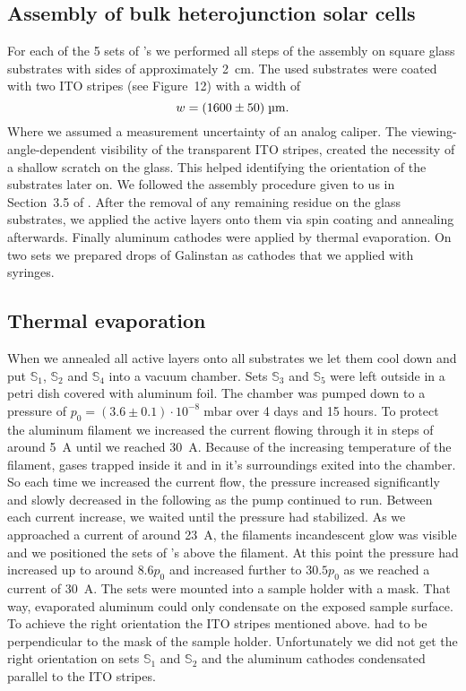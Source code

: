 \documentclass[a4paper,10pt,twocolumn]{article}
\begin{document}
\begin{extract*}
\section{Assembly of bulk heterojunction solar cells}\label{sec:assembly}
For each of the 5 sets of \BHSC's we performed all steps of the assembly on square glass substrates with sides of approximately 2~cm. The used substrates were coated with two ITO stripes (see \cite{labdesc} Figure~12) with a width of
\begin{equation*}
w = (1600\pm50)\;\text{\textmu m}.
\end{equation*}
Where we assumed a measurement uncertainty of an analog caliper. The viewing-angle-dependent visibility of the transparent ITO stripes, created the necessity of a shallow scratch on the glass. This helped identifying the orientation of the substrates later on.\mypar
We followed the assembly procedure given to us in Section~3.5 of \cite{labdesc}. After the removal of any remaining residue on the glass substrates, we applied the active layers onto them via spin coating and annealing afterwards. Finally aluminum cathodes were applied by thermal evaporation. On two sets we prepared drops of Galinstan as cathodes that we applied with syringes. 

\subsection{Thermal evaporation}
When we annealed all active layers onto all substrates we let them cool down and put $\mathbb{S}_1$, $\mathbb{S}_2$ and $\mathbb{S}_4$ into a vacuum chamber. Sets $\mathbb{S}_3$ and $\mathbb{S}_5$ were left outside in a petri dish covered with aluminum foil. The chamber was pumped down to a pressure of $p_0 = (3.6\pm 0.1)\cdot 10^{-8}\; \mathrm{mbar}$ over 4 days and 15 hours.\mypar
To protect the aluminum filament we increased the current flowing through it in steps of around 5~A until we reached 30~A. Because of the increasing temperature of the filament, gases trapped inside it and in it's surroundings exited into the chamber. So each time we increased the current flow, the pressure increased significantly and slowly decreased in the following as the pump continued to run. Between each current increase, we waited until the pressure had stabilized. As we approached a current of around 23~A, the filaments incandescent glow was visible and we positioned the sets of \BHSC's above the filament. At this point the pressure had increased up to around $8.6p_0$ and increased further to $30.5p_0$ as we reached a current of 30~A.\mypar
The sets were mounted into a sample holder with a mask. That way, evaporated aluminum could only condensate on the exposed sample surface. To achieve the right orientation the ITO stripes mentioned above. had to be perpendicular to the mask of the sample holder. Unfortunately we did not get the right orientation on sets $\mathbb{S}_1$ and $\mathbb{S}_2$ and the aluminum cathodes condensated parallel to the ITO stripes.


\end{extract*}
\end{document}

